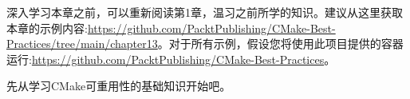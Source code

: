 深入学习本章之前，可以重新阅读第1章，温习之前所学的知识。建议从这里获取本章的示例内容:\url{https://github.com/PacktPublishing/CMake-Best-Practices/tree/main/chapter13}。对于所有示例，假设您将使用此项目提供的容器运行:\url{https://github.com/PacktPublishing/CMake-Best-Practices}。

先从学习CMake可重用性的基础知识开始吧。